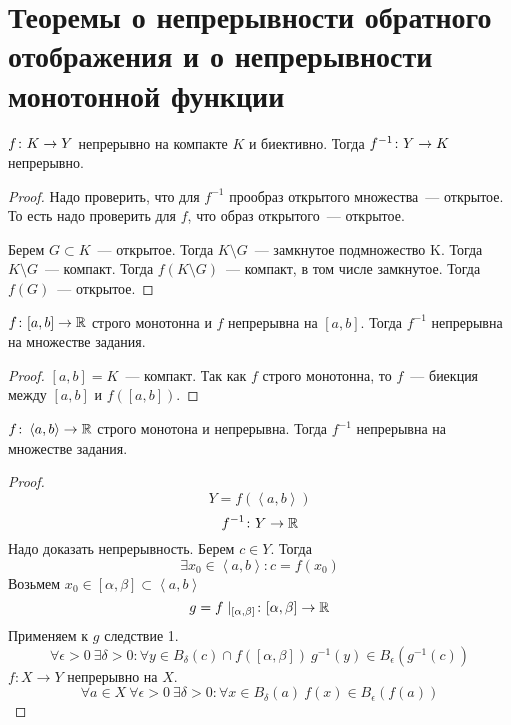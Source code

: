 ﻿\section{Теоремы о непрерывности обратного отображения и о непрерывности монотонной функции}

\begin{theorem}{}
$f\colon K \rightarrow Y$ непрерывно на компакте $K$ и биективно. Тогда $f^{-1}\colon Y \rightarrow K$ непрерывно.
\end{theorem}
\begin{proof}
Надо проверить, что для $f^{-1}$ прообраз открытого множества~--- открытое. То есть надо проверить для $f$, что образ открытого~--- открытое.

Берем $G \subset K$~--- открытое. Тогда $K \setminus G$~--- замкнутое подмножество K. Тогда $K \setminus G$~--- компакт. Тогда $f(K \setminus G)$~--- компакт, в том числе замкнутое.
Тогда $f(G)$~--- открытое.
\end{proof}

\begin{conseq}
$f\colon [a, b] \rightarrow \mathbb{R}$ строго монотонна и $f$ непрерывна на $[a, b]$. Тогда $f^{-1}$ непрерывна на множестве задания.
\end{conseq}
\begin{proof}
$[a, b] = K$~--- компакт.
Так как $f$ строго монотонна, то $f$~--- биекция между $[a, b]$ и $f([a,b])$.
\end{proof}

\begin{conseq}
$f\colon \left<a,b\right> \to \mathbb{R}$ строго монотона и непрерывна. Тогда $f^{-1}$ непрерывна на множестве задания.
\end{conseq}
\begin{proof}
$$ Y = f(\left<a,b\right>) $$
$$f^{-1}\colon Y \to \mathbb{R}$$
Надо доказать непрерывность. Берем $c \in Y$. Тогда 
$$\exists x_0\in\left<a, b\right>\colon c = f(x_0)$$
Возьмем $x_0 \in [\alpha, \beta] \subset \left<a, b\right>$
$$g = f\mid_{[\alpha, \beta]}\colon [\alpha, \beta] \to \mathbb{R}$$  
Применяем к $g$ следствие 1.
$$\forall \epsilon > 0\: \exists \delta > 0\colon \forall y \in B_{\delta}(c) \cap f([\alpha, \beta])\: g^{-1}(y) \in B_{\epsilon}(g^{-1}(c))$$
$f\colon X \to Y$ непрерывно на $X$.
$$\forall a \in X\: \forall \epsilon > 0\: \exists \delta > 0\colon \forall x \in B_{\delta}(a)\: f(x) \in B_{\epsilon}(f(a))$$
\end{proof}

